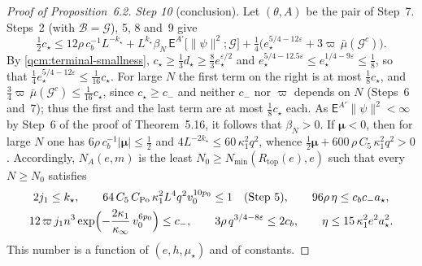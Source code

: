 \documentclass[11pt,letterpaper,reqno]{amsart}
\theoremstyle{definition}
\begin{document}
\begin{proof}[Proof of Proposition~6.2]
\emph{Step 10} (conclusion).
Let $(\theta,A)$ be the pair of Step~7.
Steps~2 (with $\mathcal B=\mathcal G$), 5, 8 and~9 give
\begin{equation*}
\tfrac12c_\star\le12\rho\,c_b^{-1}L^{-k_\star}+L^{k_\star}\beta_N\,\mathsf E^{A'}\bigl[\|\psi\|^2;\mathcal G\bigr]+\tfrac14\bigl(e_\star^{5/4-12\varepsilon}+3\varpi\,\bar\mu(\mathcal G^c)\bigr).
\end{equation*}
By \eqref{qcm:terminal-smallness}, $c_\star\ge\frac13d_\star\ge\frac83e_\star^{\varepsilon/2}$ and $e_\star^{5/4-12.5\varepsilon}\le e_\star^{1/4-9\varepsilon}\le\frac18$, so that $\frac14e_\star^{5/4-12\varepsilon}\le\frac1{16}c_\star$.
For large $N$ the first term on the right is at most $\frac18c_\star$, and $\frac34\varpi\,\bar\mu(\mathcal G^c)\le\frac1{16}c_\star$, since $c_\star\ge c_-$ and neither $c_-$ nor $\varpi$ depends on $N$ (Steps~6 and~7);
thus the first and the last term are at most $\frac18c_\star$ each.
As $\mathsf E^{A'}\|\psi\|^2<\infty$ by Step~6 of the proof of Theorem~5.16, it follows that $\beta_N>0$.
If $\boldsymbol\mu<0$, then for large $N$ one has $6\rho\,c_b^{-1}|\boldsymbol\mu|\le\frac12$ \cite[Theorem~16.4, equation~(16.19)]{QEDConstruction} and $4L^{-2k_\star}\le60\,\kappa_1^2q^2$, whence $\frac12\boldsymbol\mu+600\,\rho\,C_5\,\kappa_1^2q^2>0$.
Accordingly, $N_A(e,m)$ is the least $N_0\ge N_{\min}(R_{\mathrm{top}}(e),e)$ such that every $N\ge N_0$ satisfies
\begin{gather*}
2j_1\le k_\star,\qquad64\,C_5\,C_{\mathrm{Po}}\,\kappa_1^2L^4q^2v_0^{10p_0}\le1\quad\text{(Step~5)},\qquad96\rho\,\eta\le c_bc_-a_\star,\\
12\,\varpi\,j_1n^3\exp\Bigl(-\frac{2\kappa_1}{\kappa_\infty}\,v_0^{6p_0}\Bigr)\le c_-,\qquad3\rho\,q^{3/4-8\varepsilon}\le2c_b,\qquad\eta\le15\,\kappa_1^2e^2a_\star^2 .
\end{gather*}
This number is a function of $(e,h,\mu_\star)$ and of constants.
\end{proof}
\end{document}
